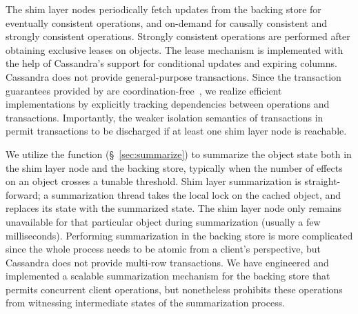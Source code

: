 The shim layer nodes periodically fetch updates from the backing store for
eventually consistent operations, and on-demand for causally consistent and
strongly consistent operations. Strongly consistent operations are performed
after obtaining exclusive leases on objects. The lease mechanism is
implemented with the help of Cassandra's support for conditional updates and
expiring columns. Cassandra does not provide general-purpose
transactions. Since the transaction guarantees provided by \name are
coordination-free~\cite{BailisHAT}, we realize efficient implementations by
explicitly tracking dependencies between operations and transactions.
Importantly, the weaker isolation semantics of transactions in \name permit
transactions to be discharged if at least one shim layer node is reachable.

We utilize the  function (\S~\ref{sec:summarize}) to summarize
the object state both in the shim layer node and the backing store, typically
when the number of effects on an object crosses a tunable threshold.
Shim layer summarization is straight-forward; a summarization thread takes the
local lock on the cached object, and replaces its state with the summarized
state. The shim layer node only remains unavailable for that particular object
during summarization (usually a few milliseconds). Performing summarization in
the backing store is more complicated since the whole process needs to be
atomic from a client's perspective, but Cassandra does not provide multi-row
transactions. We have engineered and implemented a scalable summarization
mechanism for the backing store that permits concurrent client operations, but
nonetheless prohibits these operations from witnessing intermediate states of
the summarization process.
